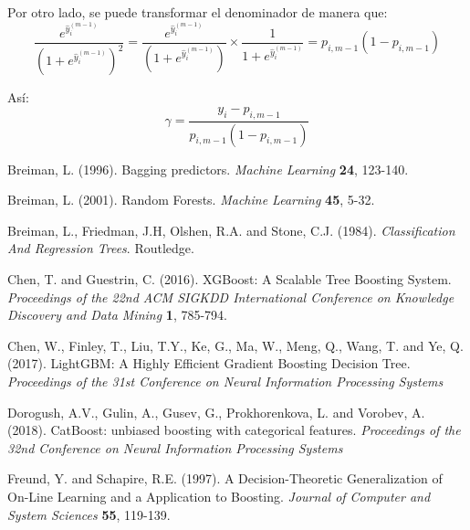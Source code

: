 \documentclass[12pt,twoside]{article}
\begin{document}
Por otro lado, se puede transformar el denominador de manera que:
\begin{equation*}
\frac{e^{\hat{y}_i^{(m-1)}}}{(1 + e^{\hat{y}_i^{(m-1)}})^2} = \frac{e^{\hat{y}_i^{(m-1)}}}{(1 + e^{\hat{y}_i^{(m-1)}})} \times \frac{1}{1 + e^{\hat{y}_i^{(m-1)}}} = p_{i, m-1}(1 - p_{i, m-1})
\end{equation*}

Así:
\begin{equation*}
\gamma = \frac{y_i - p_{i, m-1}}{p_{i, m-1}(1 - p_{i, m-1})}
\end{equation*}





\newpage
{}
\begin{thebibliography}{100}
 Breiman, L. (1996). Bagging predictors. \textit{Machine Learning} \textbf{24}, 123-140.

 Breiman, L. (2001). Random Forests. \textit{Machine Learning} \textbf{45}, 5-32.

 Breiman, L., Friedman, J.H, Olshen, R.A. and Stone, C.J. (1984).
\textit{Classification And Regression Trees}. Routledge.

 Chen, T. and Guestrin, C. (2016). XGBoost: A Scalable Tree Boosting System. \textit{Proceedings of the 22nd ACM SIGKDD International Conference on Knowledge Discovery and Data Mining} \textbf{1}, 785-794.

 Chen, W., Finley, T., Liu, T.Y., Ke, G., Ma, W., Meng, Q., Wang, T. and Ye, Q. (2017). LightGBM: A Highly Efficient Gradient Boosting Decision Tree. \textit{Proceedings of the 31st Conference on Neural Information Processing Systems}

 Dorogush, A.V., Gulin, A., Gusev, G., Prokhorenkova, L. and Vorobev, A. (2018). CatBoost: unbiased boosting with categorical features. \textit{Proceedings of the 32nd Conference on Neural Information Processing Systems}


 Freund, Y. and Schapire, R.E. (1997). A Decision-Theoretic Generalization of On-Line Learning and a Application to Boosting. \textit{Journal of Computer and System Sciences} \textbf{55}, 119-139.


\end{thebibliography}
\end{document}
